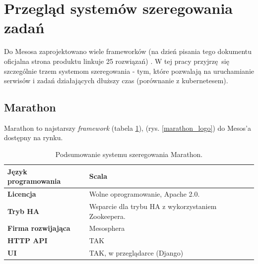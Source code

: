 \documentclass[10pt,a4paper,titlepage,twoside]{report}
\begin{document}
\newpage

\section{Przegląd systemów szeregowania zadań}

Do Mesosa zaprojektowano wiele frameworków (na dzień pisania tego dokumentu oficjalna strona produktu linkuje 25 rozwiązań) \cite{ad41}. W tej pracy przyjrzę się szczególnie trzem systemom szeregowania - tym, które pozwalają na uruchamianie serwisów i zadań działających dłuższy czas (porównanie z kubernetesem). 

\subsection{Marathon}

Marathon to najstarszy \textit{framework} (tabela \ref{marathon_info}), (rys. \ref{marathon_logo}) do Mesos'a dostępny na rynku. 
\begin{table}[!h]
\caption{Podsumowanie systemu szeregowania Marathon.}
\label{marathon_info}
\centering
\begin{tabular}{|p{4cm}|p{6cm}|}
  \hline
  \textbf{Język programowania} & Scala \\
  \hline
  \textbf{Licencja} & Wolne oprogramowanie, Apache 2.0. \\
  \hline
  \textbf{Tryb HA} & Wsparcie dla trybu HA z wykorzystaniem Zookeepera. \\
  \hline
  \textbf{Firma rozwijająca} & Mesosphera \\
  \hline
  \textbf{HTTP API} & TAK \\
  \hline
  \textbf{UI} & TAK, w przeglądarce (Django) \\
  \hline
\end{tabular}
\end{table}
\end{document}
